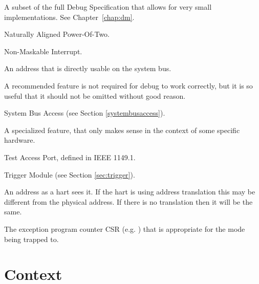 \begin{description}[style=nextline]
        A subset of the full Debug Specification that allows for very small
        implementations. See Chapter~\ref{chap:dm}.
    \item[NAPOT]
        Naturally Aligned Power-Of-Two.
    \item[NMI]
        Non-Maskable Interrupt.
    \item[physical address]
        An address that is directly usable on the system bus.
    \item[recommended feature]
        A recommended feature is not required for debug to work correctly, but
        it is so useful that it should not be omitted without good reason.
    \item[SBA]
        System Bus Access (see Section \ref{systembusaccess}).
    \item[specialized feature]
        A specialized feature, that only makes sense in the context of some
        specific hardware.
    \item[TAP]
        Test Access Port, defined in IEEE 1149.1.
    \item[TM]
        Trigger Module (see Section \ref{sec:trigger}).
    \item[virtual address]
        An address as a hart sees it. If the hart is using address translation this
        may be different from the physical address. If there is no
        translation then it will be the same.
    \item[\Rxepc]
        The exception program counter CSR (e.g. \Rmepc) that is appropriate for
        the mode being trapped to.
\end{description}

\section{Context}

